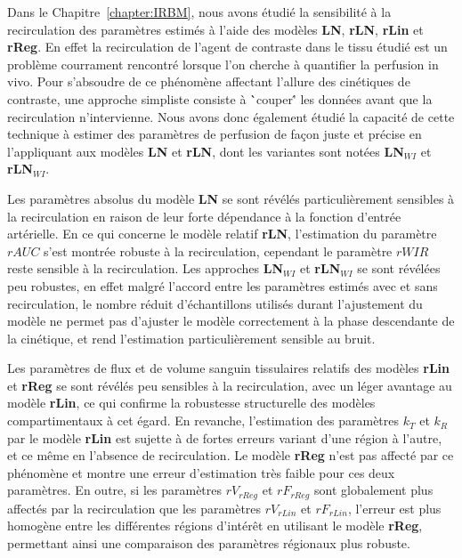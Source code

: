\begin{otherlanguage}{francais}
Dans le Chapitre~\ref{chapter:IRBM}, nous avons \'etudi\'e la sensibilit\'e \`a la recirculation des param\`etres estim\'es \`a l'aide des mod\`eles \textbf{LN}, \textbf{rLN}, \textbf{rLin} et \textbf{rReg}.
En effet la recirculation de l'agent de contraste dans le tissu \'etudi\'e est un probl\`eme courrament rencontr\'e lorsque l'on cherche \`a quantifier la perfusion in vivo.
Pour s'absoudre de ce ph\'enom\`ene affectant l'allure des cin\'etiques de contraste, une approche simpliste consiste \`a \``couper\'' les donn\'ees avant que la recirculation n'intervienne.
Nous avons donc \'egalement \'etudi\'e la capacit\'e de cette technique \`a estimer des param\`etres de perfusion de fa\c{c}on juste et pr\'ecise en l'appliquant aux mod\`eles \textbf{LN} et \textbf{rLN}, dont les variantes sont not\'ees \textbf{LN$_{WI}$} et \textbf{rLN$_{WI}$}.

Les param\`etres absolus du mod\`ele \textbf{LN} se sont r\'ev\'el\'es particuli\`erement sensibles \`a la recirculation en raison de leur forte d\'ependance \`a la fonction d'entr\'ee art\'erielle.
En ce qui concerne le mod\`ele relatif \textbf{rLN}, l'estimation du param\`etre $rAUC$ s'est montr\'ee robuste \`a la recirculation, cependant le param\`etre $rWIR$ reste sensible \`a la recirculation.
Les approches \textbf{LN$_{WI}$} et \textbf{rLN$_{WI}$} se sont r\'ev\'el\'ees peu robustes, en effet malgr\'e l'accord entre les param\`etres estim\'es avec et sans recirculation, le nombre r\'eduit d'\'echantillons utilis\'es durant l'ajustement du mod\`ele ne permet pas d'ajuster le mod\`ele correctement \`a la phase descendante de la cin\'etique, et rend l'estimation particuli\`erement sensible au bruit.

Les param\`etres de flux et de volume sanguin tissulaires relatifs des mod\`eles \textbf{rLin} et \textbf{rReg} se sont r\'ev\'el\'es peu sensibles \`a la recirculation, avec un l\'eger avantage au mod\`ele \textbf{rLin}, ce qui confirme la robustesse structurelle des mod\`eles compartimentaux \`a cet \'egard.
En revanche, l'estimation des param\`etres $k_T$ et $k_R$ par le mod\`ele \textbf{rLin} est sujette \`a de fortes erreurs variant d'une r\'egion \`a l'autre, et ce m\^eme en l'absence de recirculation.
Le mod\`ele \textbf{rReg} n'est pas affect\'e par ce ph\'enom\`ene et montre une erreur d'estimation tr\`es faible pour ces deux param\`etres.
En outre, si les param\`etres $rV_{rReg}$ et $rF_{rReg}$ sont globalement plus affect\'es par la recirculation que les param\`etres $rV_{rLin}$ et $rF_{rLin}$, l'erreur est plus homog\`ene entre les diff\'erentes r\'egions d'int\'er\^et en utilisant le mod\`ele \textbf{rReg}, permettant ainsi une comparaison des param\`etres r\'egionaux plus robuste.


\end{otherlanguage}
